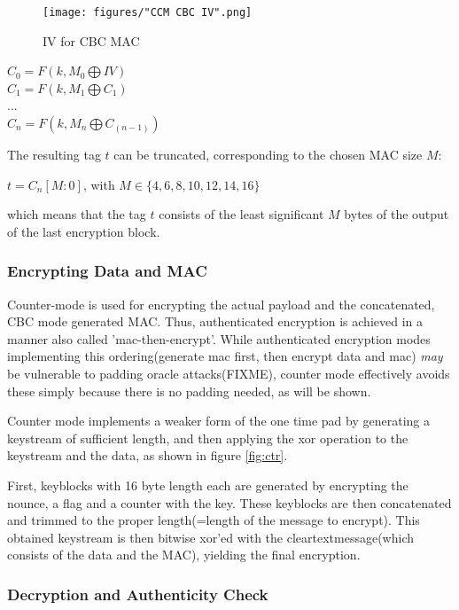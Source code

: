 \begin{figure}
    \centering
    \texttt{[image: figures/"CCM CBC IV".png]}
    \caption{IV for CBC MAC}
    \label{fig:ccrMacIV}
\end{figure}


\begin{center}
 $C_0 = F(k, M_0 \bigoplus IV )$
 \\
 $C_1 = F(k, M_1 \bigoplus C_1) $
 \\
 $...$
 \\
 $C_n = F(k, M_n \bigoplus C_{(n-1)})$
 \\
\end{center}

The resulting tag $t$ can be truncated, corresponding to the chosen MAC size $M$:
\begin{center}
  $t = C_n[M:0]$, with $M \in \{4, 6, 8, 10, 12, 14, 16\}$
\end{center}
which means that the tag $t$ consists of the least significant $M$ bytes of the output of the last encryption block.

\subsubsection{Encrypting Data and MAC}

Counter-mode is used for encrypting the actual payload and the concatenated, CBC mode generated MAC.
Thus, authenticated encryption is achieved in a manner also called 'mac-then-encrypt'. While authenticated
encryption modes implementing this ordering(generate mac first, then encrypt data and mac) \textit{may}
be vulnerable to padding oracle attacks(FIXME), counter mode effectively avoids these simply because
there is no padding needed, as will be shown.

Counter mode implements a weaker form of the one time pad by generating a keystream of sufficient
length, and then applying the \gls{xor} operation to the keystream and the data, as shown in figure \ref{fig:ctr}.


First, keyblocks with 16 byte length each are generated by encrypting the nounce, a flag and a counter with the key. These 
keyblocks are then concatenated and trimmed to the proper length(=length of the message to encrypt). This obtained keystream
is then bitwise \gls{xor}'ed with the cleartextmessage(which consists of the data and the MAC), yielding the final encryption.


\subsubsection{Decryption and Authenticity Check}

